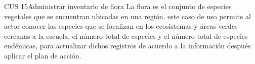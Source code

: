 
\begin{UseCase}{CUS 15}{Administrar inventario de flora}
    {
    La flora es el conjunto de especies vegetales que se encuentran ubicadas en una región, este caso de uso permite al actor conocer las especies que se localizan en los ecosistemas y áreas verdes cercanas a la escuela, el número total de especies y el número total de especies endémicas, para actualizar dichos registros de acuerdo a la información después aplicar el plan de acción. 
    }
    
    


\end{UseCase}
